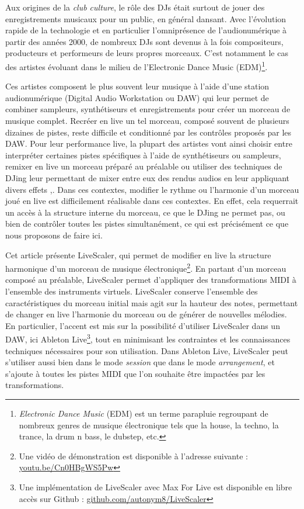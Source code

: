 Aux origines de la \emph{club culture}, le rôle des DJs était surtout de jouer des enregistrements musicaux pour un public, en général dansant. Avec l’évolution rapide de la technologie et en particulier l’omniprésence de l’audionumérique à partir des années 2000, de nombreux DJs sont devenus à la fois compositeurs, producteurs et performeurs de leurs propres morceaux. C'est notamment le cas des artistes évoluant dans le milieu de l'Electronic Dance Music (EDM)\footnote{\emph{Electronic Dance Music} (EDM) est un terme parapluie regroupant de nombreux genres de musique électronique tels que la house, la techno, la trance, la drum n bass, le dubstep, etc. }.


Ces artistes composent le plus souvent leur musique à l’aide d’une station audionumérique (Digital Audio Workstation ou DAW) qui leur permet de combiner sampleurs, synthétiseurs et enregistrements pour créer un morceau de musique complet. Recréer en live un tel morceau, composé souvent de plusieurs dizaines de pistes, reste difficile et conditionné par les contrôles proposés par les DAW. Pour leur performance live, la plupart des artistes vont ainsi choisir entre interpréter certaines pistes spécifiques à l'aide de synthétiseurs ou sampleurs, remixer en live un morceau préparé au préalable ou utiliser des techniques de DJing leur permettant de mixer entre eux des rendus audios en leur appliquant divers effets \cite{ferreira2008sound},\cite{magana2018performance}.  Dans ces contextes,  modifier le rythme ou l'harmonie d’un morceau joué en live est difficilement réalisable dans ces contextes. En effet, cela requerrait un accès à la structure interne du morceau, ce que le DJing ne permet pas, ou bien de contrôler toutes les pistes simultanément, ce qui est précisément ce que nous proposons de faire ici.

Cet article présente LiveScaler, qui per\-met de modifier en live la structure harmonique d'un morceau de musique électronique\footnote{Une vidéo de démonstration est disponible à l'adresse suivante : \href{ https://youtu.be/Cn0HBgWS5Pw}{youtu.be/Cn0HBgWS5Pw}}. En partant d'un morceau composé au préalable, LiveScaler permet d'appliquer des transformations MIDI à l'ensemble des instruments virtuels. LiveScaler conserve l'ensemble des caractéristiques du morceau initial mais agit sur la hauteur des notes, permettant de changer en live l'harmonie du morceau ou de générer de nouvelles mélodies. En particulier, l'accent est mis sur la possibilité d'utiliser LiveScaler dans un DAW, ici Ableton Live\footnote{Une implémentation de LiveScaler avec Max For Live est disponible en libre accès sur Github : \href{https://github.com/autonym8/LiveScaler}{github.com/autonym8/LiveScaler}}, tout en minimisant les contraintes et les connaissances techniques nécessaires pour son utilisation. Dans Ableton Live, LiveScaler peut s'utiliser aussi bien dans le mode \emph{session} que dans le mode \emph{arrangement}, et s'ajoute à toutes les pistes MIDI que l'on souhaite être impactées par les transformations.

